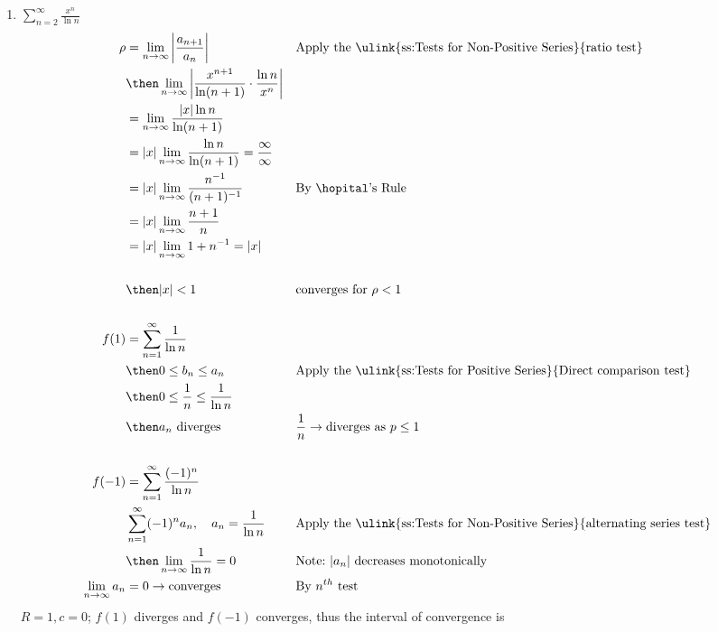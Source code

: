 \begin{enumerate}[itemsep=24em]
\newpage %

  \item \(\displaystyle \sum_{n=2}^{\infty} \frac{x^n}{\ln n} \)
    \begin{align*}
      \rho &= \lim_{n \to \infty} \left| \frac{a_{n+1}}{a_n}  \right|
           && \text{Apply the \ulink{ss:Tests for Non-Positive Series}{ratio test}} \\
      &\then \lim_{n \to \infty}
      \left| \frac{x^{n+1}}{\ln(n+1)} \cdot \frac{\ln n}{x^n}  \right| \\
      &= \lim_{n \to \infty}
     \frac{|x| \ln n}{\ln(n+1)} \\
      &= |x| \lim_{n \to \infty}
      \frac{\ln n}{\ln(n+1)}  = \frac{\infty}{\infty}\\
      &= |x| \lim_{n \to \infty} \frac{n^{-1}}{(n+1)^{-1}}
      && \text{By \hopital's Rule} \\
      &= |x| \lim_{n \to \infty} \frac{n+1}{n} \\
      &= |x| \lim_{n \to \infty} 1+n^{-1} = |x| \\
      \\
      &\then |x| < 1
      && \text{converges for}~\rho < 1 \\
      \\
      f(1) &= \sum_{n=1}^{\infty} \frac{1}{\ln n} \\
      &\then 0 \leq b_n \leq a_n
           && \text{Apply the \ulink{ss:Tests for Positive Series}{Direct comparison test}} \\
      &\then 0 \leq \frac{1}{n} \leq \frac{1}{\ln n} \\
      &\then a_n ~\text{diverges}
      && \frac{1}{n} \to \text{diverges as } p \leq 1 \\
      \\
      f(-1) &= \sum_{n=1}^{\infty} \frac{(-1)^n}{\ln n} \\
      &\sum_{n=1}^{\infty} (-1)^n a_n, \quad a_n = \frac{1}{\ln n}
      && \text{Apply the \ulink{ss:Tests for Non-Positive Series}{alternating series test}} \\
      &\then \lim_{n \to \infty} \frac{1}{\ln n} = 0
      && \text{Note:}~|a_n| ~\text{decreases monotonically}\\
      \lim_{n \to \infty}  a_n &= 0 \to \text{converges}
      && \text{By } n^{th} ~\text{test} \\
    \end{align*}
    \(R = 1, c = 0\); \(f(1)\) diverges and \(f(-1)\) converges, thus the
    interval of convergence is \aset{\([-1,1)\)}


\end{enumerate}

